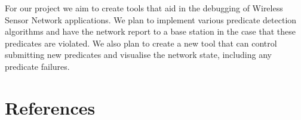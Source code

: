 \documentclass[a4paper]{article}
\begin{document}
For our project we aim to create tools that aid in the debugging of Wireless
Sensor Network applications. We plan to implement various predicate detection
algorithms and have the network report to a base station in the case that these
predicates are violated. We also plan to create a new tool that can control
submitting new predicates and visualise the network state, including any
predicate failures.

\clearpage

\appendixpage
\addappheadtotoc
\appendix


\section{References}
\renewcommand{\refname}{\vspace{-1cm}}


\end{document}
